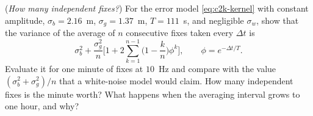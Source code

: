 \begin{prob}\label{prob:ch04:10}
(\emph{How many independent fixes?}) For the error model \eqref{eq:c2k-kernel} with constant amplitude, $\sigma_b=2.16$~m, $\sigma_g=1.37$~m, $T=111$~s, and negligible $\sigma_w$, show that the variance of the average of $n$ consecutive fixes taken every $\Delta t$ is
\begin{equation*}
\sigma_b^{2}+\frac{\sigma_g^{2}}{n}\Big[1+2\sum_{k=1}^{n-1}\Big(1-\frac{k}{n}\Big)\phi^{k}\Big],\qquad \phi=e^{-\Delta t/T}.
\end{equation*}
Evaluate it for one minute of fixes at $10$~Hz and compare with the value $(\sigma_b^{2}+\sigma_g^{2})/n$ that a white-noise model would claim. How many independent fixes is the minute worth? What happens when the averaging interval grows to one hour, and why?
\end{prob}


